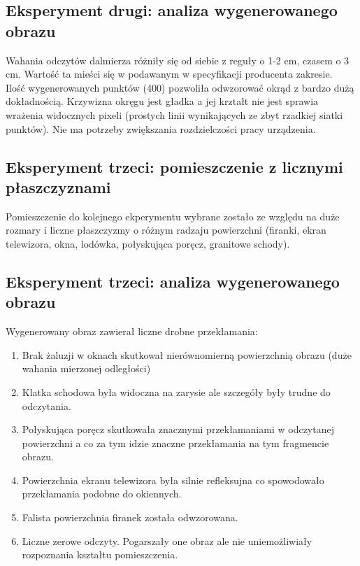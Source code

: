 \subsection {Eksperyment drugi: analiza wygenerowanego obrazu}
Wahania odczytów dalmierza różniły się od siebie z reguły o 1-2 cm, czasem o 3 cm. Wartość ta mieści się w podawanym w specyfikacji producenta zakresie.\\

Ilość wygenerowanych punktów (400) pozwoliła odwzorować okrąd z bardzo dużą dokładnością. Krzywizna okręgu jest gładka a jej krztałt nie jest sprawia wrażenia widocznych pixeli (prostych linii wynikających ze zbyt rzadkiej siatki punktów). Nie ma potrzeby zwiększania rozdzielczości pracy urządzenia.\\

\newpage
\subsection {Eksperyment trzeci: pomieszczenie z licznymi płaszczyznami}
Pomieszczenie do kolejnego ekperymentu wybrane zostało ze względu na duże rozmary i liczne płaszczyzmy o różnym radzaju powierzchni (firanki, ekran telewizora, okna, lodówka, połyskująca poręcz, granitowe schody).

\subsection {Eksperyment trzeci: analiza wygenerowanego obrazu}
Wygenerowany obraz zawierał liczne drobne przekłamania:

\begin{enumerate}
    \item Brak żaluzji w oknach skutkował nierównomierną powierzchnią obrazu (duże wahania mierzonej odległości)
    \item Klatka schodowa była widoczna na zarysie ale szczegóły były trudne do odczytania.
    \item Połyskująca poręcz skutkowała znacznymi przekłamaniami w odczytanej powierzchni a co za tym idzie znaczne przekłamania na tym fragmencie obrazu.
    \item Powierzchnia ekranu telewizora była silnie refleksujna co spowodowało przekłamania podobne do okiennych.
    \item Falista powierzchnia firanek została odwzorowana.
    \item Liczne zerowe odczyty. Pogarszały one obraz ale nie uniemożliwiały rozpoznania kształtu pomieszczenia.
\end{enumerate}
